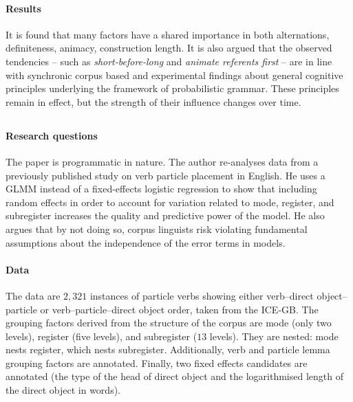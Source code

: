 \begin{mdframed}
  \paragraph{Results}

  It is found that many factors have a shared importance in both alternations, \eg definiteness, animacy, construction length.
  It is also argued that the observed tendencies -- such as \textit{short-before-long} and \textit{animate referents first} -- are in line with synchronic corpus based and experimental findings about general cognitive principles underlying the framework of probabilistic grammar.
  These principles remain in effect, but the strength of their influence changes over time.

\end{mdframed}

\begin{mdframed}

  \subsection*{\citet{Gries2015}}

  \paragraph{Research questions}
  
  The paper is programmatic in nature.
  The author re-analyses data from a previously published study on verb particle placement in English.
  He uses a GLMM instead of a fixed-effects logistic regression to show that including random effects in order to account for variation related to mode, register, and subregister increases the quality and predictive power of the model.
  He also argues that by not doing so, corpus linguists risk violating fundamental assumptions about the independence of the error terms in models.
  
  \paragraph{Data}
  
  The data are $2,321$ instances of particle verbs showing either verb--direct object--particle or verb--particle--direct object order, taken from the ICE-GB.
  The grouping factors derived from the structure of the corpus are mode (only two levels), register (five levels), and subregister ($13$ levels).
  They are nested: mode nests register, which nests subregister.
  Additionally, verb and particle lemma grouping factors are annotated.
  Finally, two fixed effects candidates are annotated (the type of the head of direct object and the logarithmised length of the direct object in words).
  

\end{mdframed}
